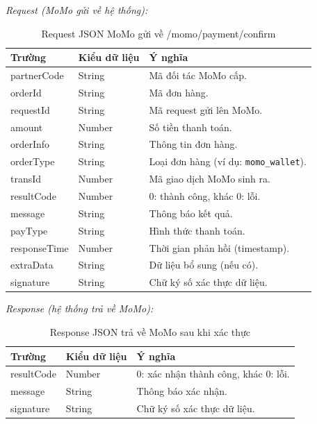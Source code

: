 \textit{Request (MoMo gửi về hệ thống):}
\begin{table}[H]
    \centering
    \caption{Request JSON MoMo gửi về /momo/payment/confirm}
    \begin{tabular}{|p{4cm}|p{2.5cm}|p{7cm}|}
        \hline
        \textbf{Trường} & \textbf{Kiểu dữ liệu} & \textbf{Ý nghĩa} \\
        \hline
        partnerCode & String & Mã đối tác MoMo cấp. \\
        \hline
        orderId & String & Mã đơn hàng. \\
        \hline
        requestId & String & Mã request gửi lên MoMo. \\
        \hline
        amount & Number & Số tiền thanh toán. \\
        \hline
        orderInfo & String & Thông tin đơn hàng. \\
        \hline
        orderType & String & Loại đơn hàng (ví dụ: \texttt{momo\_wallet}). \\
        \hline
        transId & Number & Mã giao dịch MoMo sinh ra. \\
        \hline
        resultCode & Number & 0: thành công, khác 0: lỗi. \\
        \hline
        message & String & Thông báo kết quả. \\
        \hline
        payType & String & Hình thức thanh toán. \\
        \hline
        responseTime & Number & Thời gian phản hồi (timestamp). \\
        \hline
        extraData & String & Dữ liệu bổ sung (nếu có). \\
        \hline
        signature & String & Chữ ký số xác thực dữ liệu. \\
        \hline
    \end{tabular}
\end{table}

\textit{Response (hệ thống trả về MoMo):}
\begin{table}[H]
    \centering
    \caption{Response JSON trả về MoMo sau khi xác thực}
    \begin{tabular}{|p{4cm}|p{2.5cm}|p{7cm}|}
        \hline
        \textbf{Trường} & \textbf{Kiểu dữ liệu} & \textbf{Ý nghĩa} \\
        \hline
        resultCode & Number & 0: xác nhận thành công, khác 0: lỗi. \\
        \hline
        message & String & Thông báo xác nhận. \\
        \hline
        signature & String & Chữ ký số xác thực dữ liệu. \\
        \hline
    \end{tabular}
\end{table}

